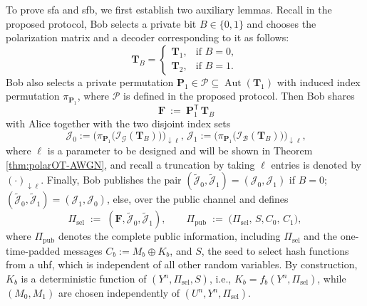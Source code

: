 \documentclass[onecolumn]{IEEEtran} %
\newcommand{\1}{\mathbbm{1}}
\DeclareMathOperator{\Aut}{Aut}
\theoremstyle{boldremark}
\newcommand{\bT}{\mathbf{T}}
\begin{document}
To prove \gls{sfa} and \gls{sfb}, we first establish two auxiliary lemmas. Recall in the proposed protocol, Bob selects a private bit $B\in\{0,1\}$ and chooses the polarization matrix and a decoder corresponding to it as follows:
\[
\bT_B = \left\{
\begin{array}{ll}
  \bT_1, & \text{if } B=0,\\
  \bT_2, & \text{if } B=1.
\end{array}
\right.
\]
Bob also selects a private permutation $\mathbf P_1\in\mathcal{P}\subseteq\Aut(\bT_1)$ with induced index
permutation $\pi_{\mathbf P_1}$, where $\mathcal{P}$ is defined in the proposed protocol. Then Bob shares
\begin{equation}\label{eq:F-published}
\ {\ \mathbf F \ :=\ \mathbf P_1^{\mathsf T}\,\bT_B\ }
\end{equation}
with Alice together with the two disjoint index sets
\begin{equation}\label{eq:I0I1-def}
\ {\;
\mathcal J_0  \!:= \!\big(\pi_{\mathbf P_1}\big(\mathcal{I}_{\mathcal G}(\bT_B)\big)\big)_{\downarrow \ell},\,
\mathcal J_1  \!:=\! \big(\pi_{\mathbf P_1}\big(\mathcal{I}_{\mathcal B}(\bT_B)\big)\big)_{\downarrow \ell},
\;}
\end{equation}
where $\ell$ is a parameter to be designed and will be shown in Theorem \ref{thm:polarOT-AWGN}, and recall a truncation by taking $\ell$ entries is denoted by
$(\cdot)_{\downarrow \ell}$. Finally, Bob publishes the pair
  $(\tilde{\mathcal{J}}_{0},\tilde{\mathcal{J}}_{1})=(\mathcal{J}_{0},\mathcal{J}_{1})$ if $B=0$;
  $(\tilde{\mathcal{J}}_{0},\tilde{\mathcal{J}}_{1})=(\mathcal{J}_{1},\mathcal{J}_{0})$, else, over the public channel and defines
\begin{equation}\label{eq:Pi-def}
\Pi_{\mathrm{sel}} \;:=\; (\mathbf F,\tilde{\mathcal{J}}_{0},\tilde{\mathcal{J}}_{1}),
\qquad
\Pi_{\mathrm{pub}} \;:=\; \bigl(\Pi_{\mathrm{sel}},\,S,C_0,\,C_1 \bigr),
\end{equation}
where \(\Pi_{\mathrm{pub}}\) denotes the complete public information, including $\Pi_{\mathrm{sel}}$ and the one-time-padded messages \( C_b := M_b \oplus K_b\), and $S$, the seed to select hash functions from a \gls{uhf}, which is independent of all other random variables. By construction, \(K_b\) is a deterministic function of \((Y^n,\Pi_{\mathrm{sel}},S)\), i.e.,
\(K_b = f_b(Y^n,\Pi_{\mathrm{sel}})\), while \((M_0,M_1)\) are chosen independently of
\((U^n,Y^n,\Pi_{\mathrm{sel}})\). 
\end{document}
